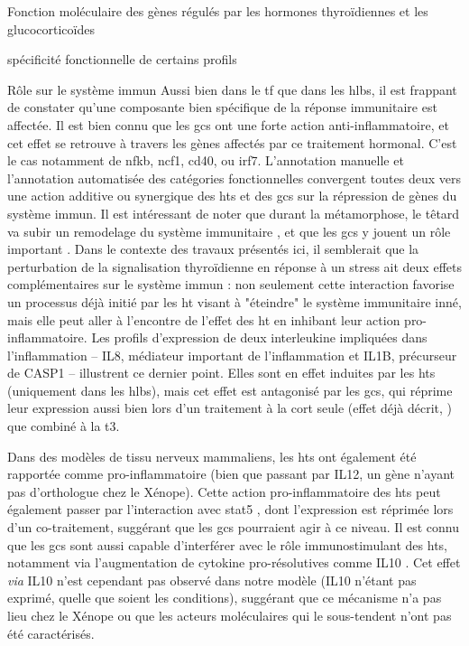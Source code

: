 \documentclass[../main.tex]{subfiles}
\begin{document}
\begin{chapter}{Fonction moléculaire des gènes régulés par les hormones thyroïdiennes et les glucocorticoïdes}
\begin{section}{spécificité fonctionnelle de certains profils}
\begin{subsection}{Rôle sur le système immun}
Aussi bien dans le \gls{tf} que dans les \glspl{hlb}, il est frappant de constater qu'une composante bien spécifique de la réponse immunitaire est affectée.
Il est bien connu que les \glspl{gc} ont une forte action anti-inflammatoire, et cet effet se retrouve à travers les gènes affectés par ce traitement hormonal.
C'est le cas notamment de \gls{nfkb}, \gls{ncf1}, \gls{cd40}, ou \gls{irf7}.
L'annotation manuelle et l'annotation automatisée des catégories fonctionnelles convergent toutes deux vers une action additive ou synergique des \glspl{ht} et des \glspl{gc} sur la répression de gènes du système immun.
Il est intéressant de noter que durant la métamorphose, le têtard va subir un remodelage du système immunitaire \citep{DuPasquier1989,Flajnik1987}, et que les \glspl{gc} y jouent un rôle important \citep{Rollins-Smith1997}.
Dans le contexte des travaux présentés ici, il semblerait que la perturbation de la signalisation thyroïdienne en réponse à un stress ait deux effets complémentaires sur le système immun :
non seulement cette interaction favorise un processus déjà initié par les \gls{ht} visant à "éteindre" le système immunitaire inné, mais elle peut aller à l'encontre de l'effet des \gls{ht} en inhibant leur action pro-inflammatoire.
Les profils d'expression de deux interleukine impliquées dans l'inflammation – IL8, médiateur important de l'inflammation et IL1B, précurseur de CASP1 – illustrent ce dernier point.
Elles sont en effet induites par les \glspl{ht} (uniquement dans les \glspl{hlb}), mais cet effet est antagonisé par les \glspl{gc}, qui réprime leur expression aussi bien lors d'un traitement à la \gls{cort} seule (effet déjà décrit, \citealp{Nissen2000}) que combiné à la \gls{t3}.
\par
Dans des modèles de tissu nerveux mammaliens, les \glspl{ht} ont également été rapportée comme pro-inflammatoire \citep{Tamura1999,Montesinos2012} (bien que passant par IL12, un gène n'ayant pas d'orthologue chez le Xénope).
Cette action pro-inflammatoire des \glspl{ht} peut également passer par l’interaction avec \gls{stat5} \citep{Favre-Young2000}, dont l'expression est réprimée lors d'un co-traitement, suggérant que les \glspl{gc} pourraient agir à ce niveau.
Il est connu que les \glspl{gc} sont aussi capable d'interférer avec le rôle immunostimulant des \glspl{ht}, notamment via l'augmentation de cytokine pro-résolutives comme IL10 \citep{Montesinos2012}.
Cet effet \textit{via} IL10 n'est cependant pas observé dans notre modèle (IL10 n'étant pas exprimé, quelle que soient les conditions), suggérant que ce mécanisme n'a pas lieu chez le Xénope ou que les acteurs moléculaires qui le sous-tendent n'ont pas été caractérisés.

\end{subsection}
\end{section}
\end{chapter}
\end{document}
